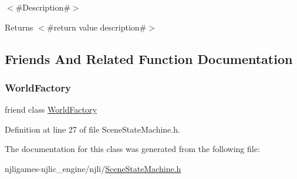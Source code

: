 $<$\#\+Description\#$>$

\begin{DoxyReturn}{Returns}
$<$\#return value description\#$>$ 
\end{DoxyReturn}


\subsection{Friends And Related Function Documentation}
\mbox{\label{classnjli_1_1_scene_state_machine_acb96ebb09abe8f2a37a915a842babfac}} 
\subsubsection{\texorpdfstring{World\+Factory}{WorldFactory}}
{\footnotesize\ttfamily friend class \mbox{\hyperlink{classnjli_1_1_world_factory}{World\+Factory}}\hspace{0.3cm}{\ttfamily [friend]}}



Definition at line 27 of file Scene\+State\+Machine.\+h.



The documentation for this class was generated from the following file\+:\begin{DoxyCompactItemize}
\item 
njligames-\/njlic\+\_\+engine/njli/\mbox{\hyperlink{_scene_state_machine_8h}{Scene\+State\+Machine.\+h}}\end{DoxyCompactItemize}
